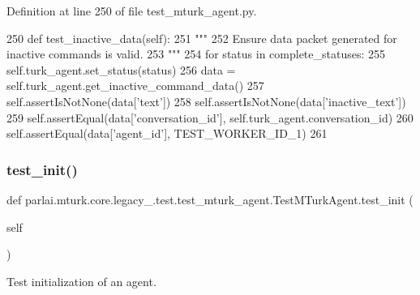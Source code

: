 Definition at line 250 of file test\+\_\+mturk\+\_\+agent.\+py.


\begin{DoxyCode}
250     \textcolor{keyword}{def }test\_inactive\_data(self):
251         \textcolor{stringliteral}{"""}
252 \textcolor{stringliteral}{        Ensure data packet generated for inactive commands is valid.}
253 \textcolor{stringliteral}{        """}
254         \textcolor{keywordflow}{for} status \textcolor{keywordflow}{in} complete\_statuses:
255             self.turk\_agent.set\_status(status)
256             data = self.turk\_agent.get\_inactive\_command\_data()
257             self.assertIsNotNone(data[\textcolor{stringliteral}{'text'}])
258             self.assertIsNotNone(data[\textcolor{stringliteral}{'inactive\_text'}])
259             self.assertEqual(data[\textcolor{stringliteral}{'conversation\_id'}], self.turk\_agent.conversation\_id)
260             self.assertEqual(data[\textcolor{stringliteral}{'agent\_id'}], TEST\_WORKER\_ID\_1)
261 
\end{DoxyCode}
\mbox{\label{classparlai_1_1mturk_1_1core_1_1legacy__2018_1_1test_1_1test__mturk__agent_1_1TestMTurkAgent_aefc023b6bc037dfa7450a4b07721e1ef}} 
\subsubsection{\texorpdfstring{test\+\_\+init()}{test\_init()}}
{\footnotesize\ttfamily def parlai.\+mturk.\+core.\+legacy\+\_.\+test.\+test\+\_\+mturk\+\_\+agent.\+Test\+M\+Turk\+Agent.\+test\+\_\+init (\begin{DoxyParamCaption}\item[{}]{self }\end{DoxyParamCaption})}

\begin{DoxyVerb}Test initialization of an agent.
\end{DoxyVerb}
 

